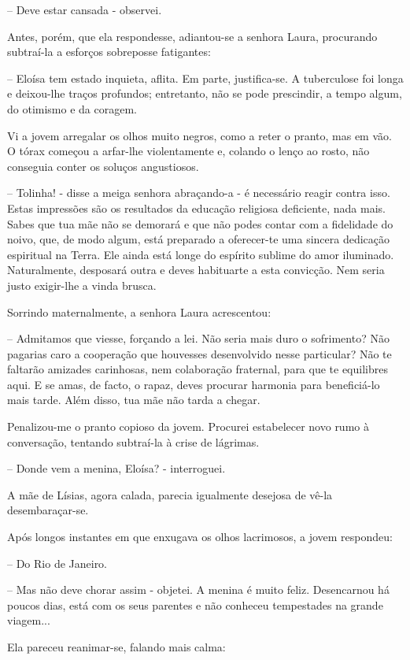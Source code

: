 \documentclass[portuguese,12pt,a4paper]{scrbook}
\begin{document}
	– Deve estar cansada - observei.
	
	
	Antes, porém, que ela respondesse, adiantou-se a senhora Laura, procurando subtraí-la a esforços sobreposse fatigantes:
	
	– Eloísa tem estado inquieta, aflita. Em parte, justifica-se. A tuberculose foi longa e deixou-lhe traços profundos; entretanto, não se pode prescindir, a tempo algum, do otimismo e da coragem.
	
	Vi a jovem arregalar os olhos muito negros, como a reter o pranto, mas em vão. O tórax começou a arfar-lhe violentamente e, colando o lenço ao rosto, não conseguia conter os soluços angustiosos.
	
	– Tolinha! - disse a meiga senhora abraçando-a - é necessário reagir contra isso. Estas impressões são os resultados da educação religiosa deficiente, nada mais. Sabes que tua mãe não se demorará e que não podes contar com a fidelidade do noivo, que, de modo algum, está preparado a oferecer-te uma sincera dedicação espiritual na Terra. Ele ainda está longe do espírito sublime do amor iluminado. Naturalmente, desposará outra e deves habituarte a esta convicção. Nem seria justo exigir-lhe a vinda brusca.
	
	Sorrindo maternalmente, a senhora Laura acrescentou:
	
	– Admitamos que viesse, forçando a lei. Não seria mais duro o sofrimento? Não pagarias caro a cooperação que houvesses desenvolvido nesse particular? Não te faltarão amizades carinhosas, nem colaboração fraternal, para que te equilibres aqui. E se amas, de facto, o rapaz, deves procurar harmonia para beneficiá-lo mais tarde. Além disso, tua mãe não tarda a chegar.
	
	Penalizou-me o pranto copioso da jovem. Procurei estabelecer novo rumo à conversação, tentando subtraí-la à crise de lágrimas.
	
	– Donde vem a menina, Eloísa? - interroguei.
	
	A mãe de Lísias, agora calada, parecia igualmente desejosa de vê-la desembaraçar-se.
	
	
	Após longos instantes em que enxugava os olhos lacrimosos, a jovem respondeu:
	
	– Do Rio de Janeiro.
	
	– Mas não deve chorar assim - objetei. A menina é muito feliz. Desencarnou há poucos dias, está com os seus parentes e não conheceu tempestades na grande viagem...
	
	Ela pareceu reanimar-se, falando mais calma:
	
\end{document}
